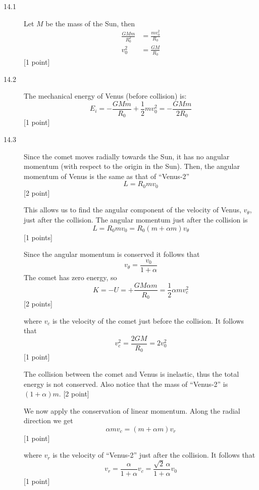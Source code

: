
\begin{description}
\item[14.1] Let $M$ be the mass of the Sun, then
  \begin{align*}
    \frac{GMm}{R_0^2} &= \frac{mv_0^2}{R_0} \\
    v_0^2 &= \frac{GM}{R_0}
  \end{align*}
  \hfill[1 point]

\item[14.2] The mechanical energy of Venus (before collision) is:
  \[
    E_i = -\frac{GMm}{R_0} + \frac{1}{2}mv_0^2 = -\frac{GMm}{2R_0}
  \]
  \hfill[1 point]

\item[14.3] Since the comet moves radially towards the Sun, it has no angular
  momentum (with respect to the origin in the Sun). Then, the angular momentum
  of Venus is the same as that of ``Venus-2''
  \[
    L = R_0 m v_0
  \]
  \hfill[2 point] %

  This allows us to find the angular component of the velocity of Venus,
  $v_\theta$, just after the collision. The angular momentum just after the
  collision is
  \[
    L = R_0 m v_0 = R_0(m + \alpha m)v_\theta
  \]
  \hfill[1 points] %

  Since the angular momentum is conserved it follows that
  \[
    v_\theta = \frac{v_0}{1 + \alpha}
  \]
  The comet has zero energy, so
  \[
    K = -U = +\frac{GM\alpha m}{R_0} = \frac{1}{2}\alpha m v_c^2
  \]
  \hfill[2 points]

  where $v_c$ is the velocity of the comet just before the collision. It
  follows that
  \[
    v_c^2 = \frac{2GM}{R_0} = 2v_0^2
  \]
  \hfill[1 point]

  The collision between the comet and Venus is inelastic, thus the total
  energy is not conserved. Also notice that the mass of ``Venus-2'' is
  $(1 + \alpha)m$. \hfill[2 point] %

  We now apply the conservation of linear momentum. Along the radial direction
  we get
  \[
    \alpha m v_c = (m + \alpha m)v_r
  \]
  \hfill[1 point]

  where $v_r$ is the velocity of ``Venus-2'' just after the collision. It
  follows that
  \[
    v_r = \frac{\alpha}{1 + \alpha}v_c = \frac{\sqrt{2}\,\alpha}{1 + \alpha}v_0
  \]
  \hfill[1 point]


\end{description}
